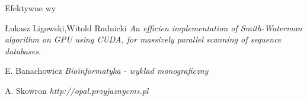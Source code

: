 \documentclass[a4paper,12pt]{article}
\begin{document}
Efektywne wy



\begin{thebibliography}{9}

  Łukasz Ligowski,Witold Rudnicki
  \emph{An efficien implementation of Smith-Waterman algorithm on GPU using CUDA, for massively parallel scanning of sequence databases.}
  
  E. Banachowicz
  \emph{Bioinformatyka - wykład monograficzny}
  
  A. Skowron
  \emph{http://opal.przyjaznycms.pl}


\end{thebibliography}
\end{document}
